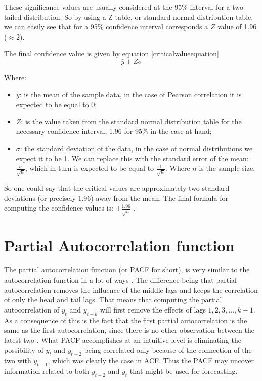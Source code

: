 \documentclass[12pt,a4paper,titlepage]{report}
\begin{document}
These significance values are usually considered at the 95\% interval for a two-tailed distribution. So by using a Z table, or standard normal distribution table, we can easily see that for a 95\% confidence interval corresponds a $ Z $ value of 1.96 ($ \approx 2 $).

The final confidence value is given by equation \ref{criticalvalueequation}
\begin{equation}
\bar{y} \pm Z \sigma 
\label{criticalvalueequation}
\end{equation}

Where:
\begin{itemize}
    \item $ \bar{y} $: is the mean of the sample data, in the case of Pearson correlation it is expected to be equal to 0;
    \item $ Z $: is the value taken from the standard normal distribution table for the necessary confidence interval, 1.96 for 95\% in the case at hand;
    \item $ \sigma $: the standard deviation of the data, in the case of normal distributions we expect it to be 1. We can replace this with the standard error of the mean: $ \frac{\sigma}{\sqrt{n}} $, which in turn is expected to be equal to $ \frac{1}{\sqrt{n}} $. Where $ n $ is the sample size.
\end{itemize}
So one could say that the critical values are approximately two standard deviations (or precisely 1.96) away from the mean. The final formula for computing the confidence values is: $ \pm \frac{1.96}{\sqrt{n}} $ \cite{nauregression}.  

\section{Partial Autocorrelation function}

The partial autocorrelation function (or PACF for short), is very similar to the autocorrelation function in a lot of ways \cite{boxjenkins}. The difference being that partial autocorrelation removes the influence of the middle lags and keeps the correlation of only the head and tail lags. That means that computing the partial autocorrelation of $ y_{t} $ and $ y_{t-k} $ will first remove the effects of lags $1, 2, 3, \dots, k-1 $. As a consequence of this is the fact that the first partial autocorrelation is the same as the first autocorrelation, since there is no other observation between the latest two \cite{fpp2nonseasonalarima}. What PACF accomplishes at an intuitive level is eliminating the possibility of $ y_{t} $ and $ y_{t-2} $ being correlated only because of the connection of the two with $ y_{t-1} $, which was clearly the case in ACF. Thus the PACF may uncover information related to both $ y_{t-2} $ and $ y_{t} $ that might be used for forecasting.
\end{document}
